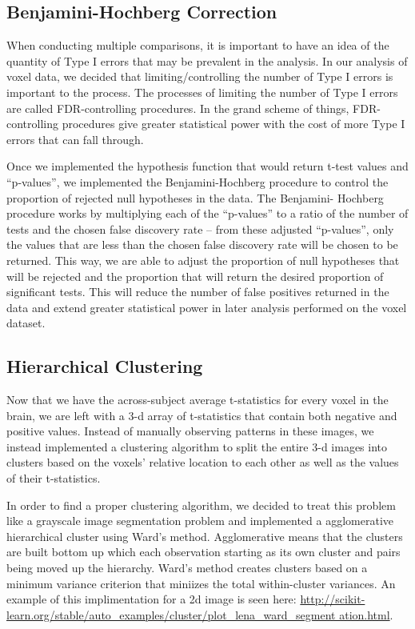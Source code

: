 
\subsection{Benjamini-Hochberg Correction}

\par \indent When conducting multiple comparisons, it is important to have an 
idea of the quantity of Type I errors that may be prevalent in the analysis. 
In our analysis of voxel data, we decided that limiting/controlling the number 
of Type I errors is important to the process. The processes of limiting the 
number of Type I errors are called FDR-controlling procedures. In the grand 
scheme of things, FDR-controlling procedures give greater statistical power 
with the cost of more Type I errors that can fall through. 

\par Once we implemented the hypothesis function that would return t-test 
values and ``p-values'', we implemented the Benjamini-Hochberg procedure to 
control the proportion of rejected null hypotheses in the data. The Benjamini-
Hochberg procedure works by multiplying each of the ``p-values'' to a ratio of 
the number of tests and the chosen false discovery rate -- from these adjusted 
``p-values'', only the values that are less than the chosen false discovery rate 
will be chosen to be returned. This way, we are able to adjust the proportion of 
null hypotheses that will be rejected and the proportion that will return the 
desired proportion of significant tests. This will reduce the number of false 
positives returned in the data and extend greater statistical power in later 
analysis performed on the voxel dataset.

\subsection{Hierarchical Clustering}

\par Now that we have the across-subject average t-statistics for every voxel 
in the brain, we are left with a 3-d array of t-statistics that contain both 
negative and positive values. Instead of manually observing patterns in these 
images, we instead implemented a clustering algorithm to split the entire 3-d 
images into clusters based on the voxels' relative location to each other as 
well as the values of their t-statistics.

\par In order to find a proper clustering algorithm, we decided to treat this
problem like a grayscale image segmentation problem and implemented a
agglomerative hierarchical cluster using Ward's method. Agglomerative means
that the clusters are built bottom up which each observation starting as its
own cluster and pairs being moved up the hierarchy. Ward's method creates
clusters based on a minimum variance criterion that miniizes the total
within-cluster variances. An example of this implimentation for a 2d image is
seen here: 
\url{http://scikit-learn.org/stable/auto_examples/cluster/plot_lena_ward_segment
 ation.html}.

